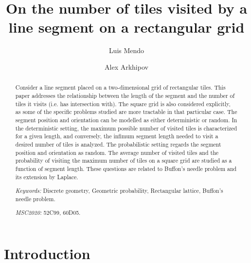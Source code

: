 \documentclass[12pt, a4paper]{article}
\begin{document}
\title{
On the number of tiles visited by a\\
line segment on a rectangular grid
}

\author[1]{Luis Mendo}
\author[2]{Alex Arkhipov}




\maketitle

\begin{abstract}
Consider a line segment placed on a two-dimensional grid of rectangular tiles. This paper addresses the relationship between the length of the segment and the number of tiles it visits (i.e. has intersection with). The square grid is also considered explicitly, as some of the specific problems studied are more tractable in that particular case. The segment position and orientation can be modelled as either deterministic or random. In the deterministic setting, the maximum possible number of visited tiles is characterized for a given length, and conversely, the infimum segment length needed to visit a desired number of tiles is analyzed. The probabilistic setting regards the segment position and orientation as random. The average number of visited tiles and the probability of visiting the maximum number of tiles on a square grid are studied as a function of segment length. These questions are related to Buffon's needle problem and its extension by Laplace. 

\emph{Keywords:} Discrete geometry, Geometric probability, Rectangular lattice, Buffon's needle problem.

\emph{MSC2020:} 52C99, 60D05.
\end{abstract}


\section{Introduction}
\label{part: intro}
\end{document}

